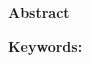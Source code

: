 \thispagestyle{empty}

\begin{center}
	\Large
	\textbf{Abstract}
\end{center}
\vspace{5pt}

	


\textbf{Keywords: } \textit{}
	
\newpage